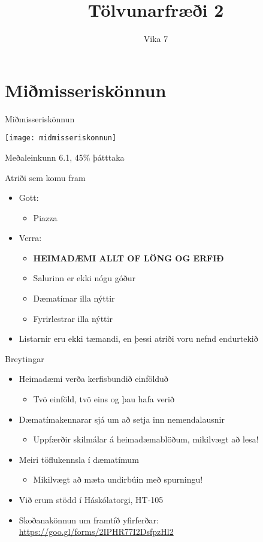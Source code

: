 \documentclass{beamer}
\title{Tölvunarfræði 2}
\subtitle{Vika 7}
\begin{document}
\begin{frame}
\titlepage
\end{frame}

\section{Miðmisseriskönnun}

\begin{frame}{Miðmisseriskönnun}
\begin{center}
\texttt{[image: midmisseriskonnun]}
\end{center}
Meðaleinkunn 6.1, 45\% þátttaka
\end{frame}

\begin{frame}{Atriði sem komu fram}
\begin{itemize}
 \item Gott:
 \begin{itemize}
  \item Piazza \pause
 \end{itemize}
 \item Verra:
 \begin{itemize}
  \item \textbf{HEIMADÆMI ALLT OF LÖNG OG ERFIÐ}
  \item Salurinn er ekki nógu góður
  \item Dæmatímar illa nýttir
  \item Fyrirlestrar illa nýttir
 \end{itemize}
 \item Listarnir eru ekki tæmandi, en þessi atriði voru nefnd endurtekið
\end{itemize}
\end{frame}

\begin{frame}{Breytingar}
\begin{itemize}
 \item Heimadæmi verða kerfisbundið einfölduð
 \begin{itemize}
  \item Tvö einföld, tvö eins og þau hafa verið
 \end{itemize}
 \item Dæmatímakennarar sjá um að setja inn nemendalausnir
 \begin{itemize}
  \item Uppfærðir skilmálar á heimadæmablöðum, mikilvægt að lesa!
 \end{itemize}
 \item Meiri töflukennsla í dæmatímum
 \begin{itemize}
  \item Mikilvægt að mæta undirbúin með spurningu!
 \end{itemize}
 \item Við erum stödd í Háskólatorgi, HT-105
 \item Skoðanakönnun um framtíð yfirferðar: \url{https://goo.gl/forms/2IPHR77I2DsfpzHl2}
\end{itemize}
\end{frame}
\end{document}
